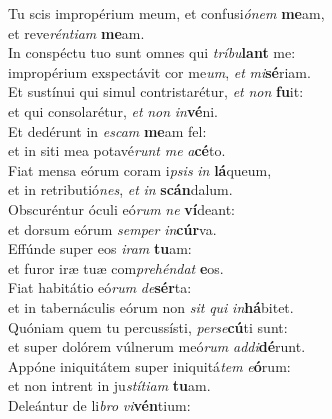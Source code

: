 \oddverse Tu scis impropérium meum, et confusi\textit{ó}\textit{nem} \textbf{me}am,~\*\\
\oddverse et reve\textit{rén}\textit{ti}\textit{am} \textbf{me}am.\\
\evenverse In conspéctu tuo sunt omnes qui \textit{trí}\textit{bu}\textbf{lant} me:~\*\\
\evenverse impropérium exspectávit cor me\textit{um}, \textit{et} \textit{mi}\textbf{sé}riam.\\
\oddverse Et sustínui qui simul contristarétur, \textit{et} \textit{non} \textbf{fu}it:~\*\\
\oddverse et qui consolarétur, \textit{et} \textit{non} \textit{in}\textbf{vé}ni.\\
\evenverse Et dedérunt in \textit{e}\textit{scam} \textbf{me}am fel:~\*\\
\evenverse et in siti mea potavé\textit{runt} \textit{me} \textit{a}\textbf{cé}to.\\
\oddverse Fiat mensa eórum coram i\textit{psis} \textit{in} \textbf{lá}queum,~\*\\
\oddverse et in retributió\textit{nes}, \textit{et} \textit{in} \textbf{scán}dalum.\\
\evenverse Obscuréntur óculi eó\textit{rum} \textit{ne} \textbf{ví}deant:~\*\\
\evenverse et dorsum eórum \textit{sem}\textit{per} \textit{in}\textbf{cúr}va.\\
\oddverse Effúnde super eos \textit{i}\textit{ram} \textbf{tu}am:~\*\\
\oddverse et furor iræ tuæ com\textit{pre}\textit{hén}\textit{dat} \textbf{e}os.\\
\evenverse Fiat habitátio eó\textit{rum} \textit{de}\textbf{sér}ta:~\*\\
\evenverse et in tabernáculis eórum non \textit{sit} \textit{qui} \textit{in}\textbf{há}bitet.\\
\oddverse Quóniam quem tu percussísti, \textit{per}\textit{se}\textbf{cú}ti sunt:~\*\\
\oddverse et super dolórem vúlnerum meó\textit{rum} \textit{ad}\textit{di}\textbf{dé}runt.\\
\evenverse Appóne iniquitátem super iniquitá\textit{tem} \textit{e}\textbf{ó}rum:~\*\\
\evenverse et non intrent in ju\textit{stí}\textit{ti}\textit{am} \textbf{tu}am.\\
\oddverse Deleántur de li\textit{bro} \textit{vi}\textbf{vén}tium:~\*\\
